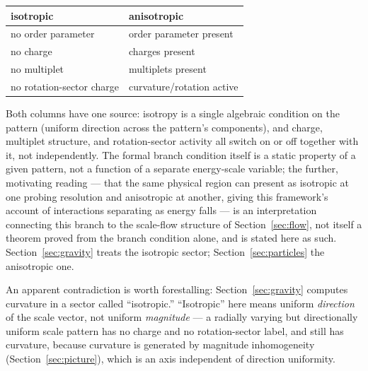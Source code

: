 \documentclass[aps,prd,twocolumn,superscriptaddress,nofootinbib]{revtex4-2}
\begin{document}
\begin{center}
\begin{tabular}{ll}
\toprule
isotropic & anisotropic \\
\midrule
no order parameter & order parameter present \\
no charge & charges present \\
no multiplet & multiplets present \\
no rotation-sector charge & curvature/rotation active \\
\bottomrule
\end{tabular}
\end{center}

Both columns have one source: isotropy is a single algebraic condition
on the pattern (uniform direction across the pattern's components), and
charge, multiplet structure, and rotation-sector activity all switch on
or off together with it, not independently. The formal branch condition
itself is a static property of a given pattern, not a function of a
separate energy-scale variable; the further, motivating reading — that
the same physical region can present as isotropic at one probing
resolution and anisotropic at another, giving this framework's account
of interactions separating as energy falls — is an interpretation
connecting this branch to the scale-flow structure of
Section~\ref{sec:flow}, not itself a theorem proved from the branch
condition alone, and is stated here as such. Section~\ref{sec:gravity}
treats the isotropic sector; Section~\ref{sec:particles} the anisotropic
one.

An apparent contradiction is worth forestalling: Section~\ref{sec:gravity}
computes curvature in a sector called ``isotropic.'' ``Isotropic'' here
means uniform \emph{direction} of the scale vector, not uniform
\emph{magnitude} — a radially varying but directionally uniform scale
pattern has no charge and no rotation-sector label, and still has
curvature, because curvature is generated by magnitude inhomogeneity
(Section~\ref{sec:picture}), which is an axis independent of direction
uniformity.
\end{document}

